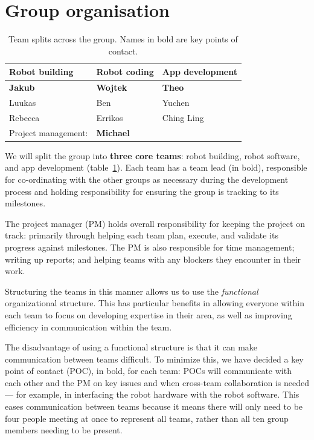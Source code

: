 \documentclass{article}
\begin{document}
\section{Group organisation}
\begin{table}[]
  \begin{tabular}{lll}
    \hline
    Robot building & Robot coding & App development   \\
    \hline
    {\bf Jakub}          & {\bf Wojtek}       & {\bf Theo}              \\
    Luukas         & Ben          & Yuchen            \\
    Rebecca        & Errikos      & Ching Ling \\
    \hline
    Project management: & {\bf Michael} & \\
  \end{tabular}
  \caption{Team splits across the group. Names in bold are key points of contact.}
  \label{tab:group-split}
\end{table}

We will split the group into {\bf three core teams}: robot building, robot software, and app development (table~\ref{tab:group-split}). Each team has a team lead (in bold), responsible for co-ordinating with the other groups as necessary during the development process and holding responsibility for ensuring the group is tracking to its milestones.

The project manager (PM) holds overall responsibility for keeping the project on track: primarily through helping each team plan, execute, and validate its progress against milestones. The PM is also responsible for time management; writing up reports; and helping teams with any blockers they encounter in their work.

Structuring the teams in this manner allows us to use the {\it functional} organizational structure. This has particular benefits in allowing everyone within each team to focus on developing expertise in their area, as well as improving efficiency in communication within the team.

The disadvantage of using a functional structure is that it can make communication between teams difficult. To minimize this, we have decided a key point of contact (POC), in bold, for each team: POCs will communicate with each other and the PM on key issues and when cross-team collaboration is needed --- for example, in interfacing the robot hardware with the robot software. This eases communication between teams because it means there will only need to be four people meeting at once to represent all teams, rather than all ten group members needing to be present.
\end{document}
